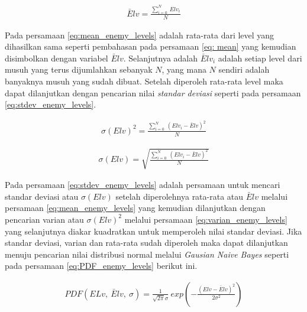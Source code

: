 \begin{equation}\label{eq:mean_enemy_levels}
\begin{split}
\bar{E}lv = \frac{\sum_{i = 0}^{N}\ Elv_{i}}{N}
\end{split}
\end{equation}
\vspace{1ex}

Pada persamaan \ref{eq:mean_enemy_levels} adalah rata-rata dari level yang dihasilkan sama seperti pembahasan pada persamaan \ref{eq: mean} yang kemudian disimbolkan dengan variabel $\bar{E}lv$. Selanjutnya adalah $\bar{E}lv_{i}$ adalah setiap level dari musuh yang terus dijumlahkan sebanyak $N$, yang mana $N$ sendiri adalah banyaknya musuh yang sudah dibuat. Setelah diperoleh rata-rata level maka dapat dilanjutkan dengan pencarian nilai \textit{standar deviasi} seperti pada persamaan \ref{eq:stdev_enemy_levels}.
\vspace{1ex}

\begin{equation}\label{eq:varian_enemy_levels}
\begin{split}
\sigma(Elv)^2 = \frac{\sum_{i = 0}^{N}\ (Elv_{i} - \bar{E}lv)^{2}}{N}
\end{split}
\end{equation}

\begin{equation}\label{eq:stdev_enemy_levels}
\begin{split}
\sigma(Elv) = \sqrt{\frac{\sum_{i = 0}^{N}\ (Elv_{i} - \bar{E}lv)^{2}}{N}}
\end{split}
\end{equation}

Pada persamaan \ref{eq:stdev_enemy_levels} adalah persamaan untuk mencari standar deviasi atau $\sigma(Elv)$ setelah diperolehnya rata-rata atau $\bar{E}lv$ melalui persamaan \ref{eq:mean_enemy_levels} yang kemudian dilanjutkan dengan pencarian varian atau $\sigma(Elv)^2$ melalui persamaan \ref{eq:varian_enemy_levels} yang selanjutnya diakar kuadratkan untuk memperoleh nilai standar deviasi. Jika standar deviasi, varian dan rata-rata sudah diperoleh maka dapat dilanjutkan menuju pencarian nilai distribusi normal melalui \textit{Gausian Naive Bayes} seperti pada persamaan \ref{eq:PDF_enemy_levels} berikut ini.
\vspace{1ex}

\begin{equation}\label{eq:PDF_enemy_levels}
\begin{split}
PDF(ELv,\ \bar{E}lv,\ \sigma) = \frac{1}{\sqrt{2 \pi} \sigma}\ exp \left(-\frac{(Elv - \bar{E}lv)^2}{2 \sigma^2}\right)
\end{split}
\end{equation}

